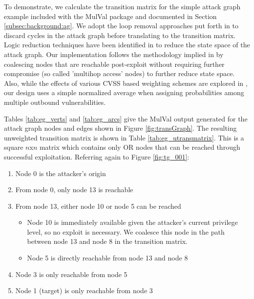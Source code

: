 To demonstrate, we calculate the transition matrix for the simple attack graph example included with the MulVal package and documented in Section \ref{subsec:background:ag}. We adopt the loop removal approaches put forth in \cite{Ou_Boyer_McQueen_2006} to discard cycles in the attack graph before translating to the transition matrix. Logic reduction techniques have been identified in \cite{Hong_Kim_Takaoka_2013} to reduce the state space of the attack graph.  Our implementation follows the methodology implied in \cite{Abraham_2016} by coalescing nodes that are reachable post-exploit without requiring further compromise (so called 'multihop access' nodes) to further reduce state space. Also, while the effects of various CVSS based weighting schemes are explored in \cite{Sembiring_Ramadhan_Gondokaryono_Arman_2015}, our design uses a simple normalized average when assigning probabilities among multiple outbound vulnerabilities.

Tables \ref{tab:eg_verts} and \ref{tab:eg_arcs} give the MulVal output generated for the attack graph nodes and edges shown in Figure \ref{fig:transGraph}. The resulting unweighted transition matrix is shown in Table \ref{tab:eg_utransmatrix}. This is a square $n$x$n$ matrix which contains only OR nodes that can be reached through successful exploitation.
Referring again to Figure \ref{fig:tg_001}:
\begin{enumerate}
\item Node 0 is the attacker's origin
\item From node 0, only node 13 is reachable
\item From node 13, either node 10 or node 5 can be reached
\begin{itemize}
\item Node 10 is immediately available given the attacker's current privilege level, so no exploit is necessary. We coalesce this node in the path between node 13 and node 8 in the transition matrix.
\item Node 5 is directly reachable from node 13 and node 8
\end{itemize}
\item Node 3 is only reachable from node 5
\item Node 1 (target) is only reachable from node 3
\end{enumerate}


\begin{table}[ht]
\tiny\centering
\caption{Unweighted Transition Matrix}
\label{tab:eg_utransmatrix}
\end{table}

